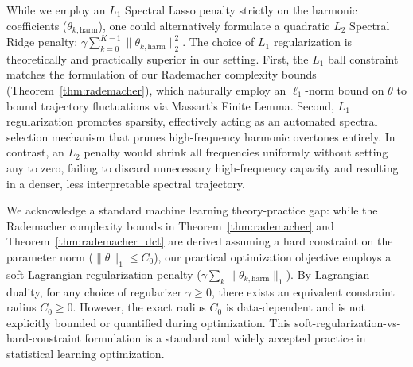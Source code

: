 \begin{remark}
While we employ an $L_1$ Spectral Lasso penalty strictly on the harmonic coefficients ($\theta_{k,\text{harm}}$), one could alternatively formulate a quadratic $L_2$ Spectral Ridge penalty: $\gamma \sum_{k=0}^{K-1} \|\theta_{k,\text{harm}}\|_2^2$. The choice of $L_1$ regularization is theoretically and practically superior in our setting. First, the $L_1$ ball constraint matches the formulation of our Rademacher complexity bounds (Theorem~\ref{thm:rademacher}), which naturally employ an $\ell_1$-norm bound on $\theta$ to bound trajectory fluctuations via Massart's Finite Lemma. Second, $L_1$ regularization promotes sparsity, effectively acting as an automated spectral selection mechanism that prunes high-frequency harmonic overtones entirely. In contrast, an $L_2$ penalty would shrink all frequencies uniformly without setting any to zero, failing to discard unnecessary high-frequency capacity and resulting in a denser, less interpretable spectral trajectory.
\end{remark}

\begin{remark}
We acknowledge a standard machine learning theory-practice gap: while the Rademacher complexity bounds in Theorem~\ref{thm:rademacher} and Theorem~\ref{thm:rademacher_dct} are derived assuming a hard constraint on the parameter norm ($\|\theta\|_1 \le C_0$), our practical optimization objective employs a soft Lagrangian regularization penalty ($\gamma \sum_k \|\theta_{k,\text{harm}}\|_1$). By Lagrangian duality, for any choice of regularizer $\gamma \ge 0$, there exists an equivalent constraint radius $C_0 \ge 0$. However, the exact radius $C_0$ is data-dependent and is not explicitly bounded or quantified during optimization. This soft-regularization-vs-hard-constraint formulation is a standard and widely accepted practice in statistical learning optimization.
\end{remark}

